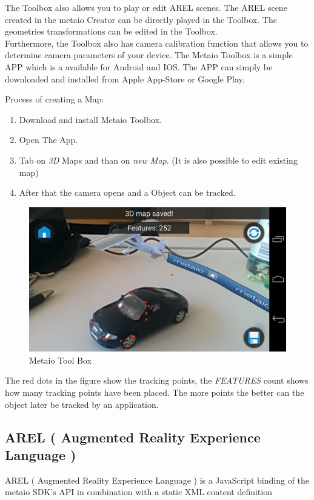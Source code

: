 The Toolbox also allows you to play or edit AREL scenes. The AREL scene created in the metaio Creator can be directly played in the Toolbox. The geometries transformations can be edited in the Toolbox.
\\


Furthermore, the Toolbox also has camera calibration function that allows you to determine camera parameters of your device.  The Metaio Toolbox is a simple APP which is a available for Android and IOS. The APP can simply be downloaded and installed from Apple App-Store or Google Play.\cite{metaioToolBox}

Process of creating a Map:
\begin{enumerate}
\item Download and install Metaio Toolbox.
\item Open The App.
\item Tab on \textit{3D} Maps and than on \textit{new Map}. (It is also possible to edit existing map)
\item After that the camera opens and a Object can be tracked.
\end{enumerate}    
\begin{figure}[htbp]
\centering
\includegraphics[width=\textwidth,height=\textheight,keepaspectratio]{graphics/tracking.png}
\caption{Metaio Tool Box}
\end{figure}
The red dots in the figure show the tracking points, the \textit{FEATURES} count shows how many tracking points have been placed. The more points the better can the object later be tracked by an application.

\subsection{AREL ( Augmented Reality Experience Language )} 
AREL ( Augmented Reality Experience Language ) is a JavaScript binding of the metaio SDK's API in combination with a static XML content definition

